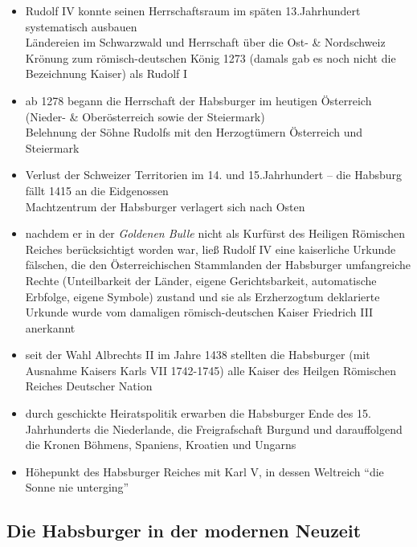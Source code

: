 \documentclass[11pt,a4paper]{article}
\begin{document}
\begin{itemize}
\item Rudolf IV konnte seinen Herrschaftsraum im späten 13.Jahrhundert systematisch ausbauen\\
 Ländereien im Schwarzwald und Herrschaft über die Ost- \& Nordschweiz\\
 Krönung zum römisch-deutschen König 1273 (damals gab es noch nicht die Bezeichnung Kaiser) als Rudolf I

\item ab 1278 begann die Herrschaft der Habsburger im heutigen Österreich (Nieder- \& Oberösterreich sowie der Steiermark)\\
 Belehnung der Söhne Rudolfs mit den Herzogtümern Österreich und Steiermark

\item Verlust der Schweizer Territorien im 14. und 15.Jahrhundert -- die Habsburg fällt 1415 an die Eidgenossen\\
 Machtzentrum der Habsburger verlagert sich nach Osten

\item nachdem er in der \textsl{Goldenen Bulle} nicht als Kurfürst des Heiligen Römischen Reiches berücksichtigt worden war, ließ Rudolf IV eine kaiserliche Urkunde fälschen, die den Österreichischen Stammlanden der Habsburger umfangreiche Rechte (Unteilbarkeit der Länder, eigene Gerichtsbarkeit, automatische Erbfolge, eigene Symbole) zustand und sie als Erzherzogtum deklarierte\\
 Urkunde wurde vom damaligen römisch-deutschen Kaiser Friedrich III anerkannt

\item seit der Wahl Albrechts II im Jahre 1438 stellten die Habsburger (mit Ausnahme Kaisers Karls VII 1742-1745) alle Kaiser des Heilgen Römischen Reiches Deutscher Nation

\item durch geschickte Heiratspolitik erwarben die Habsburger Ende des 15. Jahrhunderts die Niederlande, die Freigrafschaft Burgund und darauffolgend die Kronen Böhmens, Spaniens, Kroatien und Ungarns

\item Höhepunkt des Habsburger Reiches mit Karl V, in dessen Weltreich "`die Sonne nie unterging"'

\end{itemize}



\subsection*{\textsf{Die Habsburger in der modernen Neuzeit}}
\end{document}
